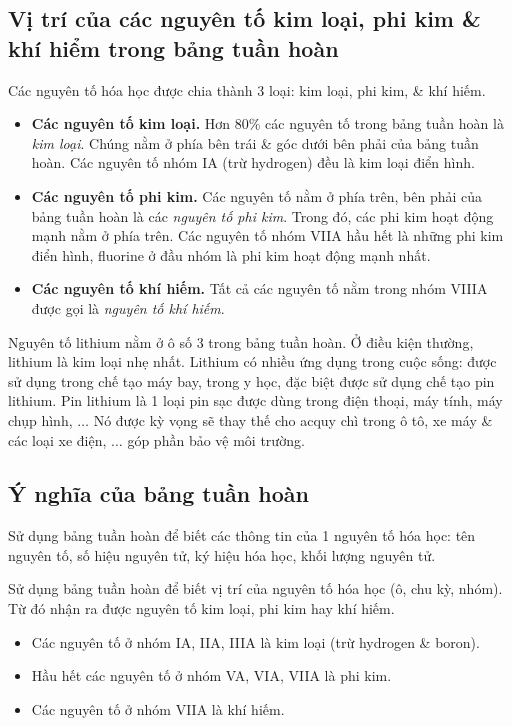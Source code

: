 \documentclass{article}
\begin{document}
\subsection{Vị trí của các nguyên tố kim loại, phi kim \& khí hiểm trong bảng tuần hoàn}
Các nguyên tố hóa học được chia thành 3 loại: kim loại, phi kim, \& khí hiếm.
\begin{itemize}
	\item \textbf{Các nguyên tố kim loại.} Hơn 80\% các nguyên tố trong bảng tuần hoàn là \textit{kim loại}. Chúng nằm ở phía bên trái \& góc dưới bên phải của bảng tuần hoàn. Các nguyên tố nhóm IA (trừ hydrogen) đều là kim loại điển hình.
	\item \textbf{Các nguyên tố phi kim.} Các nguyên tố nằm ở phía trên, bên phải của bảng tuần hoàn là các \textit{nguyên tố phi kim}. Trong đó, các phi kim hoạt động mạnh nằm ở phía trên. Các nguyên tố nhóm VIIA hầu hết là những phi kim điển hình, fluorine ở đầu nhóm là phi kim hoạt động mạnh nhất.
	\item \textbf{Các nguyên tố khí hiếm.} Tất cả các nguyên tố nằm trong nhóm VIIIA được gọi là \textit{nguyên tố khí hiếm}.
\end{itemize}
Nguyên tố lithium  nằm ở ô số 3 trong bảng tuần hoàn. Ở điều kiện thường, lithium là kim loại nhẹ nhất. Lithium có nhiều ứng dụng trong cuộc sống: được sử dụng trong chế tạo máy bay, trong y học, đặc biệt được sử dụng chế tạo pin lithium. Pin lithium là 1 loại pin sạc được dùng trong điện thoại, máy tính, máy chụp hình, $\ldots$ Nó được kỳ vọng sẽ thay thế cho acquy chì trong ô tô, xe máy \& các loại xe điện, $\ldots$ góp phần bảo vệ môi trường.

\subsection{Ý nghĩa của bảng tuần hoàn}
Sử dụng bảng tuần hoàn để biết các thông tin của 1 nguyên tố hóa học: tên nguyên tố, số hiệu nguyên tử, ký hiệu hóa học, khối lượng nguyên tử.

Sử dụng bảng tuần hoàn để biết vị trí của nguyên tố hóa học (ô, chu kỳ, nhóm). Từ đó nhận ra được nguyên tố kim loại, phi kim hay khí hiếm.
\begin{itemize}
	\item Các nguyên tố ở nhóm IA, IIA, IIIA là kim loại (trừ hydrogen \& boron).
	\item Hầu hết các nguyên tố ở nhóm VA, VIA, VIIA là phi kim.
	\item Các nguyên tố ở nhóm VIIA là khí hiếm.
\end{itemize}
\end{document}
